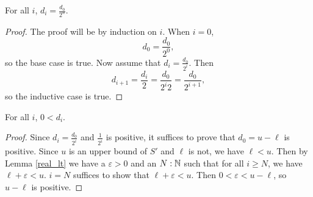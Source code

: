 \documentclass[../../math.tex]{subfiles}
\begin{document}
\begin{lemma} \label{real_sup_d_eq}
    For all $i$, $d_i = \frac{d_0}{2^n}$.
\end{lemma}
\begin{proof}
    The proof will be by induction on $i$.  When $i = 0$,
    \[
        d_0 = \frac{d_0}{2^0},
    \]
    so the base case is true.  Now assume that $d_i = \frac{d_0}{2^i}$.  Then
    \[
        d_{i+1} = \frac{d_i}{2} = \frac{d_0}{2^i2} = \frac{d_0}{2^{i+1}},
    \]
    so the inductive case is true.
\end{proof}

\begin{lemma} \label{real_sup_d_pos}
    For all $i$, $0 < d_i$.
\end{lemma}
\begin{proof}
    Since $d_i = \frac{d_0}{2^i}$ and $\frac{1}{2^i}$ is positive, it suffices
    to prove that $d_0 = u - \ell$ is positive.  Since $u$ is an upper bound of
    $S'$ and $\ell$ is not, we have $\ell < u$.  Then by Lemma \ref{real_lt} we
    have a $\varepsilon > 0$ and an $N : \mathbb{N}$ such that for all $i \geq N$, we
    have $\ell + \varepsilon < u$.  $i = N$ suffices to show that $\ell +
    \varepsilon < u$.  Then $0 < \varepsilon < u - \ell$, so $u - \ell$ is
    positive.
\end{proof}
\end{document}
